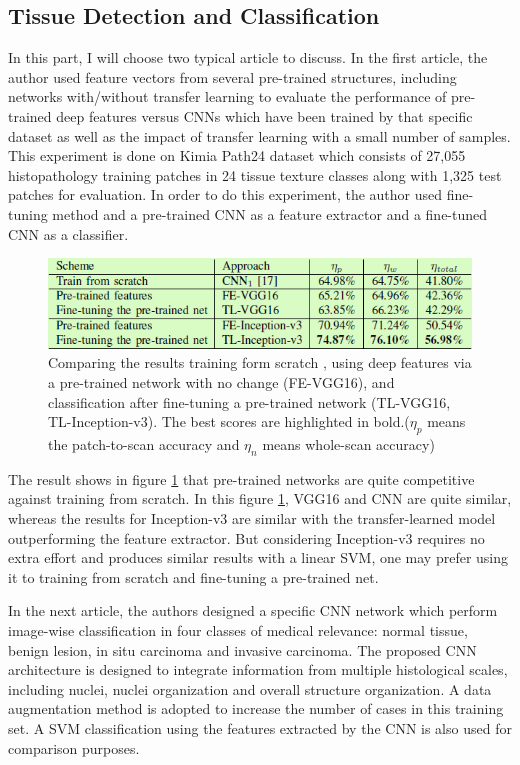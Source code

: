 \documentclass[10pt,twocolumn,letterpaper]{article}
\begin{document}
\subsection{Tissue Detection and Classification}

In this part, I will choose two typical article to discuss. In the first article\cite{kieffer2017convolutional}, the author used feature vectors from several pre-trained structures, including networks with/without transfer learning to evaluate the performance of pre-trained deep features versus CNNs which have been trained by that specific dataset as well as the impact of transfer learning with a small number of samples. This experiment is done on Kimia Path24 dataset which consists of 27,055 histopathology training patches in 24 tissue texture classes along with 1,325 test patches for evaluation. In order to do this experiment, the author used fine-tuning method and a pre-trained CNN as a feature extractor and a fine-tuned CNN as a classifier.

\begin{figure}[t]
	\begin{center}
		\includegraphics[width=0.8\linewidth]{Pic/12.png}
	\end{center}
	\caption{Comparing the results training form scratch , using deep features via a pre-trained network with no change (FE-VGG16), and classification after fine-tuning a pre-trained network (TL-VGG16, TL-Inception-v3). The best scores are highlighted in bold.(\textit{$\eta_p$} means the patch-to-scan accuracy and \textit{$\eta_n$} means whole-scan accuracy)}
	\label{fig:lovhgmjng}

\end{figure}

The result shows in figure \ref{fig:lovhgmjng} that pre-trained networks are quite competitive against training from scratch. In this figure \ref{fig:lovhgmjng}, VGG16 and CNN are quite similar, whereas the results for Inception-v3 are similar with the transfer-learned model outperforming the feature extractor. But considering Inception-v3 requires no extra effort and produces similar results with a linear SVM, one may prefer using it to training from scratch and fine-tuning a pre-trained net.

In the next article\cite{araujo2017classification}, the authors designed a specific CNN network which perform image-wise classification in four classes of medical relevance: normal tissue, benign lesion, in situ carcinoma and invasive carcinoma. The proposed CNN architecture is designed to integrate information from multiple histological scales, including nuclei, nuclei organization and overall structure organization. A data augmentation method is adopted to increase the number of cases in this training set. A SVM classification using the features extracted by the CNN is also used for comparison purposes.
\end{document}
